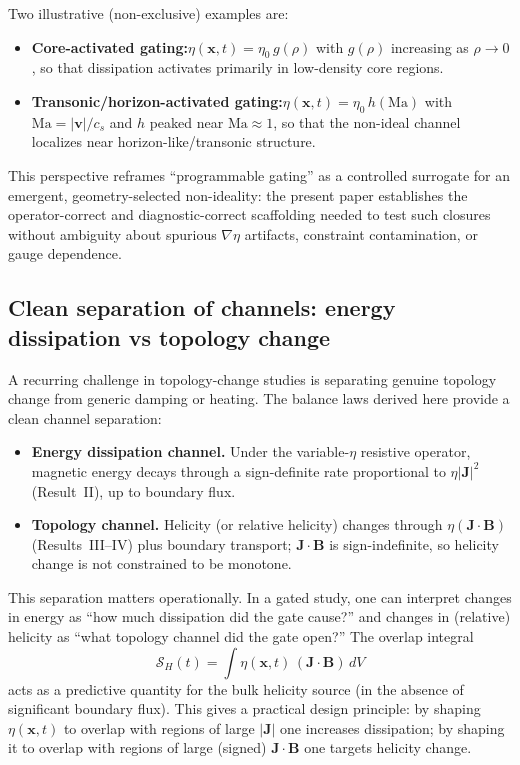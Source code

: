 \documentclass[11pt]{article}
\theoremstyle{plain}
\theoremstyle{definition}
\theoremstyle{remark}
\newcommand{\B}{\mathbf{B}}
\newcommand{\J}{\mathbf{J}}
\newcommand{\vfield}{\mathbf{v}}
\begin{document}
Two illustrative (non-exclusive) examples are:
\begin{itemize}[leftmargin=*]
  \item \textbf{Core-activated gating:}\quad $\eta(\mathbf{x},t)=\eta_0\,g(\rho)$ with $g(\rho)$ increasing as $\rho\to 0$, so that dissipation activates primarily in low-density core regions.
  \item \textbf{Transonic/horizon-activated gating:}\quad $\eta(\mathbf{x},t)=\eta_0\,h(\mathrm{Ma})$ with $\mathrm{Ma}=|\vfield|/c_s$ and $h$ peaked near $\mathrm{Ma}\approx 1$, so that the non-ideal channel localizes near horizon-like/transonic structure.
\end{itemize}

This perspective reframes ``programmable gating'' as a controlled surrogate for an emergent, geometry-selected non-ideality: the present paper establishes the operator-correct and diagnostic-correct scaffolding needed to test such closures without ambiguity about spurious $\nabla\eta$ artifacts, constraint contamination, or gauge dependence.

\subsection{Clean separation of channels: energy dissipation vs topology change}\label{sec:discussion_channels}
A recurring challenge in topology-change studies is separating genuine topology change from generic
damping or heating. The balance laws derived here provide a clean channel separation:

\begin{itemize}[leftmargin=*]
  \item \textbf{Energy dissipation channel.}
  Under the variable-$\eta$ resistive operator, magnetic energy decays through a sign-definite rate
  proportional to $\eta|\J|^2$ (Result~II), up to boundary flux.

  \item \textbf{Topology channel.}
  Helicity (or relative helicity) changes through $\eta(\J\cdot\B)$ (Results~III--IV) plus boundary
  transport; $\J\cdot\B$ is sign-indefinite, so helicity change is not constrained to be monotone.
\end{itemize}

This separation matters operationally. In a gated study, one can interpret changes in energy as
``how much dissipation did the gate cause?'' and changes in (relative) helicity as ``what topology
channel did the gate open?'' The overlap integral
\[
\mathcal{S}_H(t)=\int \eta(\mathbf{x},t)\,(\J\cdot\B)\,dV
\]
acts as a predictive quantity for the bulk helicity source (in the absence of significant boundary
flux). This gives a practical design principle: by shaping $\eta(\mathbf{x},t)$ to overlap with regions
of large $|\J|$ one increases dissipation; by shaping it to overlap with regions of large (signed)
$\J\cdot\B$ one targets helicity change.
\end{document}
